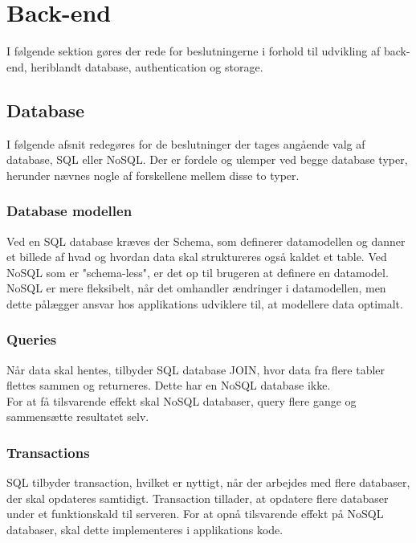 \section{Back-end}
I følgende sektion gøres der rede for beslutningerne i forhold til udvikling af back-end, heriblandt database, authentication og storage.

\subsection{Database}
I følgende afsnit redegøres for de beslutninger der tages angående valg af database, SQL\cite{SQL} eller NoSQL\cite{NoSQL}.
Der er fordele og ulemper ved begge database typer, herunder nævnes nogle af forskellene mellem disse to typer.

\subsubsection{Database modellen}

Ved en SQL database kræves der Schema\cite{Schema}, som definerer datamodellen og danner et billede af hvad og hvordan data skal struktureres også kaldet et table. Ved NoSQL som er "schema-less", er det op til brugeren at definere en datamodel. NoSQL er mere fleksibelt, når det omhandler ændringer i datamodellen, men dette pålægger ansvar hos applikations udviklere til, at modellere data optimalt.

\subsubsection{Queries\cite{Query}}
Når data skal hentes, tilbyder SQL database JOIN\cite{JOIN}, hvor data fra flere tabler flettes sammen og returneres. Dette har en NoSQL database ikke. \\
For at få tilsvarende effekt skal NoSQL databaser, query flere gange og sammensætte resultatet selv.

\subsubsection{Transactions\cite{Transactions}}
 SQL tilbyder transaction, hvilket er nyttigt, når der arbejdes med flere databaser, der skal opdateres samtidigt. Transaction tillader, at opdatere flere databaser under et funktionskald til serveren. For at opnå tilsvarende effekt på NoSQL databaser, skal dette implementeres i applikations kode. 

